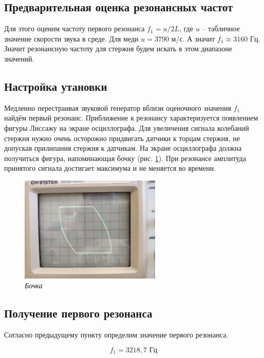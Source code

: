\documentclass[a4paper,12pt]{article}
\begin{document}
\subsection{Предварительная оценка резонансных частот}

Для этого оценим частоту первого резонанса $f_1 = u / 2L$, где $u$ -- табличное значение скорости звука в среде. Для меди $u = 3790$ м/с. А значит $f_1 \approx 3160$ Гц. Значит резонансную частоту для стержня будем искать в этом диапазоне значений.

\subsection{Настройка утановки}

Медленно перестраивая звуковой генератор вблизи оценочного значения $f_1$ найдём первый резонанс. Приближение к резонансу характеризуется появлением фигуры Лиссажу на экране осциллографа. Для увеличения сигнала колебаний стержня нужно очень осторожно придвигать датчики к торцам стержня, не допуская прилипания стержня к датчикам. На экране осциллографа должна получиться фигура, напоминающая бочку (рис. \ref{barrel}). При резонансе амплитуда принятого сигнала достигает максимума и не меняется во времени.

\begin{figure}[h!]
        \centering
	\includegraphics[width=0.6\textwidth]{barrel.jpg}
	\caption{\textit{Бочка}}
	\label{barrel}
\end{figure}

\subsection{Получение первого резонанса}

Согласно предыдущему пункту определим значение первого резонанса. 

\begin{equation}
    f_1 = 3218,7 \text{ Гц}
\end{equation}
\end{document}
